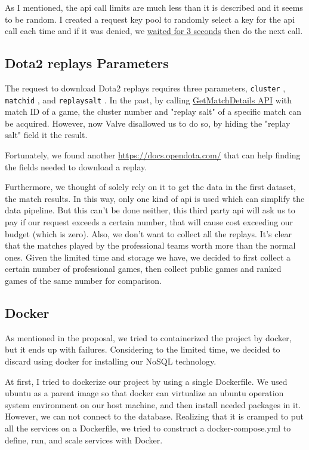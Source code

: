 \documentclass{article}
\newcommand{\codeinline}[1]{
    \texttt{#1}
}
\begin{document}
As I mentioned, the api call limits are much less than it is described and it seems to be random. I created a request key pool to randomly select a key for the api call each time and if it was denied, we \href{https://github.com/Vopaaz/big-data-psg-lgd/blob/a9a285e0e29c0d9e56b41994875df830c7e7b51b/src/main/java/FetchStore/ValveAPI.java#L241-L249}{waited for 3 seconds} then do the next call.


\subsection{Dota2 replays Parameters}

The request to download Dota2 replays requires three parameters, \codeinline{cluster}, \codeinline{matchid}, and \codeinline{replaysalt}.
In the past, by calling \href{https://wiki.teamfortress.com/wiki/WebAPI/GetMatchDetails}{GetMatchDetails API} with match ID of a game, the cluster number and "replay salt" of a specific match can be acquired. However, now Valve disallowed us to do so, by hiding the "replay salt" field it the result.

Fortunately, we found another \href{third-party api}{https://docs.opendota.com/} that can help finding the fields needed to download a replay.

Furthermore, we thought of solely rely on it to get the data in the first dataset, the match results. In this way, only one kind of api is used which can simplify the data pipeline. But this can't be done neither, this third party api will ask us to pay if our request exceeds a certain number, that will cause cost exceeding our budget (which is zero).
Also, we don't want to collect all the replays. It's clear that the matches played by the professional teams worth more than the normal ones.
Given the limited time and storage we have, we decided to first collect a certain number of professional games, then collect public games and ranked games of the same number for comparison.

\subsection{Docker}

As mentioned in the proposal, we tried to containerized the project by docker, but it ends up with failures. Considering to the limited time, we decided to discard using docker for installing our NoSQL technology.

At first, I tried to dockerize our project by using a single Dockerfile.
We used ubuntu as a parent image so that docker can virtualize an ubuntu operation system environment on our host machine, and then install needed packages in it.
However, we can not connect to the database.
Realizing that it is cramped to put all the services on a Dockerfile, we tried to construct a docker-compose.yml to define, run, and scale services with Docker.
\end{document}

